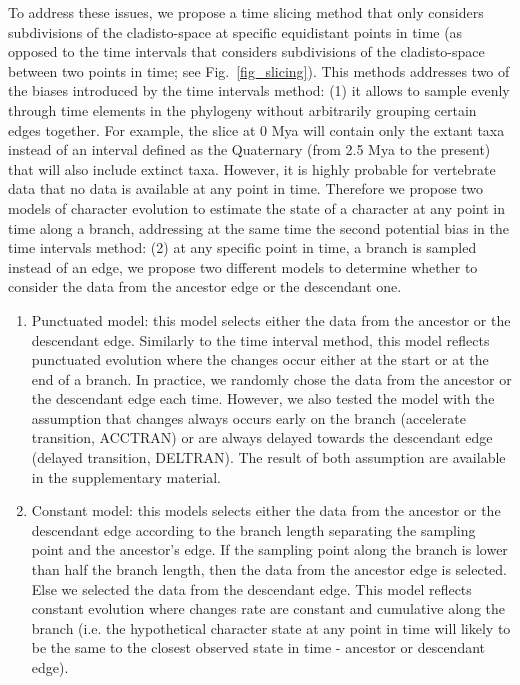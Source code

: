 \documentclass[12pt,letterpaper]{article}
\begin{document}
To address these issues, we propose a time slicing method that only considers subdivisions of the cladisto-space at specific equidistant points in time (as opposed to the time intervals that considers  subdivisions of the cladisto-space between two points in time; see Fig.~\ref{fig_slicing}). This methods addresses two of the biases introduced by the time intervals method: (1) it allows to sample evenly through time elements in the phylogeny without arbitrarily grouping certain edges together. For example, the slice at 0 Mya will contain only the extant taxa instead of an interval defined as the Quaternary (from 2.5 Mya to the present) that will also include extinct taxa. However, it is highly probable for vertebrate data that no data is available at any point in time. Therefore we propose two models of character evolution to estimate the state of a character at any point in time along a branch, addressing at the same time the second potential bias in the time intervals method: (2) at any specific point in time, a branch is sampled instead of an edge, we propose two different models to determine whether to consider the data from the ancestor edge or the descendant one.
\begin{enumerate}
\item{Punctuated model:} this model selects either the data from the ancestor or the descendant edge. Similarly to the time interval method, this model reflects punctuated evolution where the changes occur either at the start or at the end of a branch. In practice, we randomly chose the data from the ancestor or the descendant edge each time. However, we also tested the model with the assumption that changes always occurs early on the branch (accelerate transition, ACCTRAN) or are always delayed towards the descendant edge (delayed transition, DELTRAN). The result of both assumption are available in the supplementary material.
\item{Constant model:} this models selects either the data from the ancestor or the descendant edge according to the branch length separating the sampling point and the ancestor's edge. If the sampling point along the branch is lower than half the branch length, then the data from the ancestor edge is selected. Else we selected the data from the descendant edge. This model reflects constant evolution where changes rate are constant and cumulative along the branch (i.e. the hypothetical character state at any point in time will likely to be the same to the closest observed state in time - ancestor or descendant edge).
\end{enumerate}
\end{document}

